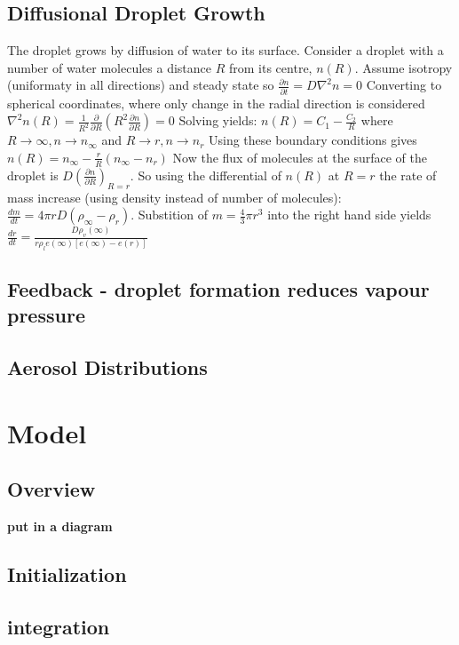 \documentclass[11pt]{article} %
\begin{document}
\subsection{Diffusional Droplet Growth}

The droplet grows by diffusion of water to its surface.  Consider a droplet with a number of water molecules a distance $R$ from its centre, $n(R)$.  Assume isotropy (uniformaty in all directions) and steady state so $\frac{\partial n}{\partial t} = D \nabla^{2} n = 0$  Converting to spherical coordinates, where only change in the radial direction is considered $\nabla^{2}n(R) = \frac{1}{R^{2}}\frac{\partial}{\partial R} \left( R^{2} \frac{\partial n}{\partial R} \right) = 0$ Solving yields: $n(R) = C_{1} - \frac{C_{2}}{R}$ where $R \rightarrow \infty, n \rightarrow n_{\infty}$ and $R \rightarrow r, n \rightarrow n_{r}$ Using these boundary conditions gives $n(R) = n_{\infty} - \frac{r}{R}(n_{\infty} - n_{r})$ Now the flux of molecules at the surface of the droplet is $D \left( \frac{\partial n}{\partial R} \right)_{R = r}$. So using the differential of $n(R)$  at $R = r$ the rate of mass increase (using density instead of number of molecules): $\frac{dm}{dt} = 4 \pi r D (\rho_{\infty} - \rho_{r})$.  Substition of $m = \frac{4}{3}\pi r^{3}$ into the right hand side yields $\frac{dr}{dt} = \frac{D\rho_{v}(\infty)}{r\rho_{l}e(\infty)[e(\infty) - e(r)]}$ 
  
\subsection{Feedback - droplet formation reduces vapour pressure}

\subsection{Aerosol Distributions}

\section{Model}
\subsection{Overview}
\bf{put in a diagram}

\subsection{Initialization}

\subsection{integration}
\end{document}
